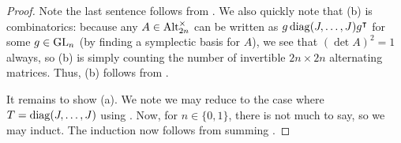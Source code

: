 \begin{proof}
    Note the last sentence follows from . We also quickly note that (b) is combinatorics: because any $A\in\operatorname{Alt}_{2n}^\times$ can be written as $g\operatorname{diag}(J,\ldots,J)g^\intercal$ for some $g\in\operatorname{GL}_n$ (by finding a symplectic basis for $A$), we see that $(\det A)^2=1$ always, so (b) is simply counting the number of invertible $2n\times2n$ alternating matrices. Thus, (b) follows from \cite[Theorem~7.5.5]{hach-gf}.
    
    It remains to show (a). We note we may reduce to the case where $T=\operatorname{diag}(J,\ldots,J)$ using . Now, for $n\in\{0,1\}$, there is not much to say, so we may induct. The induction now follows from summing .
\end{proof}
